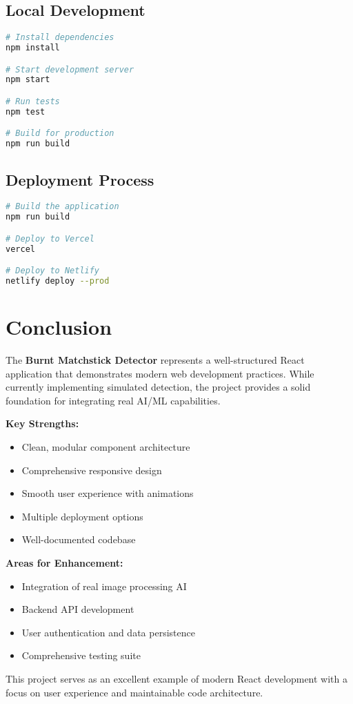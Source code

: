 \documentclass[12pt,a4paper]{article}
\begin{document}
\subsection{Local Development}
\begin{lstlisting}[language=bash]
# Install dependencies
npm install

# Start development server
npm start

# Run tests
npm test

# Build for production
npm run build
\end{lstlisting}

\subsection{Deployment Process}
\begin{lstlisting}[language=bash]
# Build the application
npm run build

# Deploy to Vercel
vercel

# Deploy to Netlify
netlify deploy --prod
\end{lstlisting}

\section{Conclusion}

The \textbf{Burnt Matchstick Detector} represents a well-structured React application that demonstrates modern web development practices. While currently implementing simulated detection, the project provides a solid foundation for integrating real AI/ML capabilities.

\textbf{Key Strengths:}
\begin{itemize}
    \item Clean, modular component architecture
    \item Comprehensive responsive design
    \item Smooth user experience with animations
    \item Multiple deployment options
    \item Well-documented codebase
\end{itemize}

\textbf{Areas for Enhancement:}
\begin{itemize}
    \item Integration of real image processing AI
    \item Backend API development
    \item User authentication and data persistence
    \item Comprehensive testing suite
\end{itemize}

This project serves as an excellent example of modern React development with a focus on user experience and maintainable code architecture.
\end{document}

